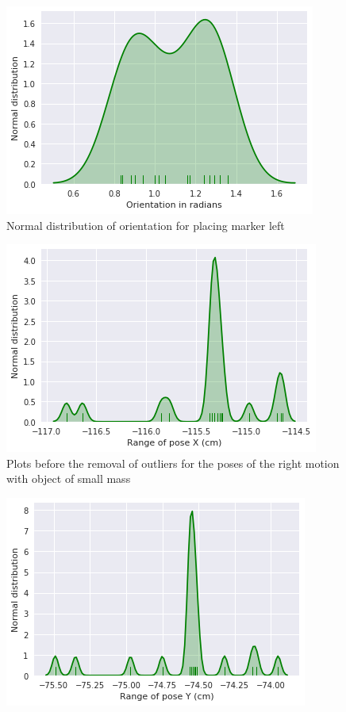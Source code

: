 \documentclass[11pt,a4paper]{article}
\begin{document}
\begin{itemize}
				\begin{figure}[H]
					\centering
					\includegraphics[scale=0.6]{small_left_o}
					\caption{Normal distribution of orientation for placing marker left}			
				\end{figure}
				\begin{figure}[H]
					\centering
					\includegraphics[scale=0.6]{small_right}
					\caption{Plots before the removal of outliers for the poses of the right motion with object of small mass}			
				\end{figure}
				\begin{figure}[H]
					\centering
					\includegraphics[scale=0.6]{small_right_y_}

\end{figure}
\end{itemize}
\end{document}
